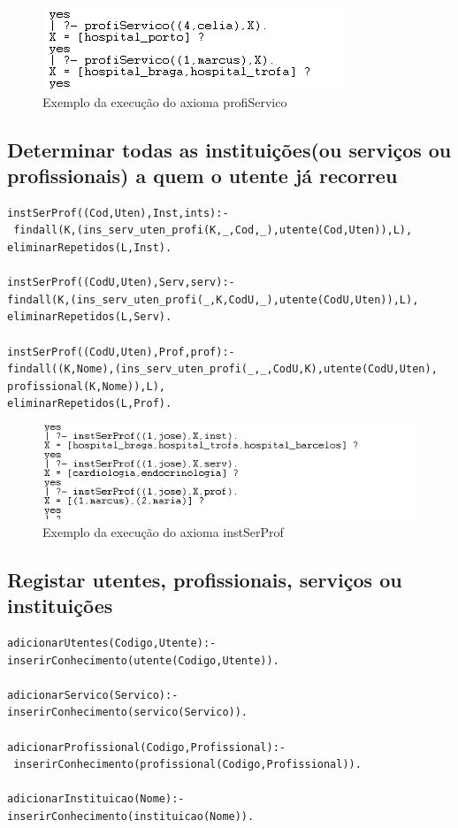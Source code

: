 \begin{figure}[<+htpb+>]
	\centering
	\includegraphics[scale=0.9]{answer7.png}
	\caption{Exemplo da execução do axioma profiServico}
	\label{p3:fig:output7}
\end{figure}

\subsection{Determinar todas as instituições(ou serviços ou profissionais) a quem o utente já recorreu}

\begin{verbatim}
instSerProf((Cod,Uten),Inst,ints):-
 findall(K,(ins_serv_uten_profi(K,_,Cod,_),utente(Cod,Uten)),L),
eliminarRepetidos(L,Inst).

instSerProf((CodU,Uten),Serv,serv):-
findall(K,(ins_serv_uten_profi(_,K,CodU,_),utente(CodU,Uten)),L),
eliminarRepetidos(L,Serv).

instSerProf((CodU,Uten),Prof,prof):-
findall((K,Nome),(ins_serv_uten_profi(_,_,CodU,K),utente(CodU,Uten),
profissional(K,Nome)),L),
eliminarRepetidos(L,Prof).
\end{verbatim}

\newpage
\begin{figure}[<+htpb+>]
	\centering
	\includegraphics[scale=0.9]{answer8.png}
	\caption{Exemplo da execução do axioma instSerProf}
	\label{p3:fig:output8}
\end{figure}


\subsection{Registar utentes, profissionais, serviços ou instituições}
\begin{Verbatim}
adicionarUtentes(Codigo,Utente):- 
inserirConhecimento(utente(Codigo,Utente)).

adicionarServico(Servico):- 
inserirConhecimento(servico(Servico)).

adicionarProfissional(Codigo,Profissional):-
 inserirConhecimento(profissional(Codigo,Profissional)).

adicionarInstituicao(Nome):- 
inserirConhecimento(instituicao(Nome)).


\end{Verbatim}

